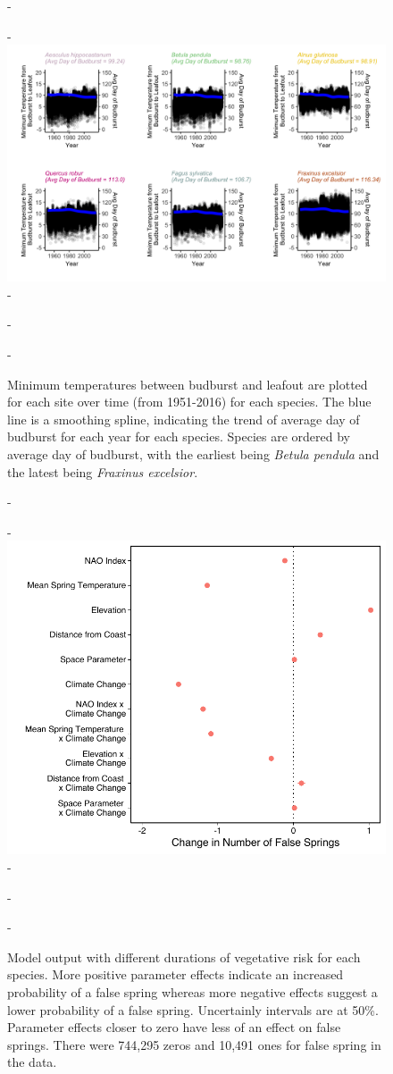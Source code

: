 \documentclass{article}\usepackage[]{graphicx}\usepackage[]{color}
\begin{document}
{\begin{figure} [H]
  -\begin{center}
  -\includegraphics[width=16cm]{..//figures/TminBB_bySpp.png}
  -\caption{Minimum temperatures between budburst and leafout are plotted for each site over time (from 1951-2016) for each species. The blue line is a smoothing spline, indicating the trend of average day of budburst for each year for each species. Species are ordered by average day of budburst, with the earliest being \textit{Betula pendula} and the latest being \textit{Fraxinus excelsior}. }\label{fig:tmin}
  -\end{center}
  -\end{figure}}
  
  {\begin{figure} [H]
  -\begin{center}
  -\includegraphics[width=12cm]{..//figures/model_output_dvr_50.pdf}
  -\caption{Model output with different durations of vegetative risk for each species. More positive parameter effects indicate an increased probability of a false spring whereas more negative effects suggest a lower probability of a false spring. Uncertainly intervals are at 50\%. Parameter effects closer to zero have less of an effect on false springs. There were 744,295 zeros and 10,491 ones for false spring in the data.}\label{fig:dvr}
  -\end{center}
  -\end{figure}}
\end{document}
